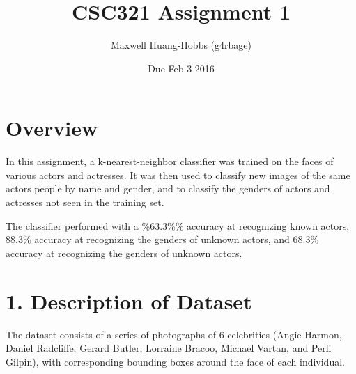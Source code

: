 \documentclass[]{article}
\title{CSC321 Assignment 1\\\vspace{0.5em}{\large Classifying Faces with K-Nearest Neighbors}}
\author{Maxwell Huang-Hobbs (g4rbage)}
\date{Due Feb 3 2016}
\begin{document}
\maketitle

\section{Overview}\label{overview}

In this assignment, a k-nearest-neighbor classifier was trained on the
faces of various actors and actresses. It was then used to classify new
images of the same actors people by name and gender, and to classify the
genders of actors and actresses not seen in the training set.

The classifier performed with a \%63.3\%\% accuracy at recognizing known
actors, \(88.3\)\% accuracy at recognizing the genders of unknown
actors, and \(68.3\)\% accuracy at recognizing the genders of unknown
actors.

\section{1. Description of Dataset}\label{description-of-dataset}

The dataset consists of a series of photographs of 6 celebrities (Angie
Harmon, Daniel Radcliffe, Gerard Butler, Lorraine Bracoo, Michael
Vartan, and Perli Gilpin), with corresponding bounding boxes around the
face of each individual.
\end{document}
